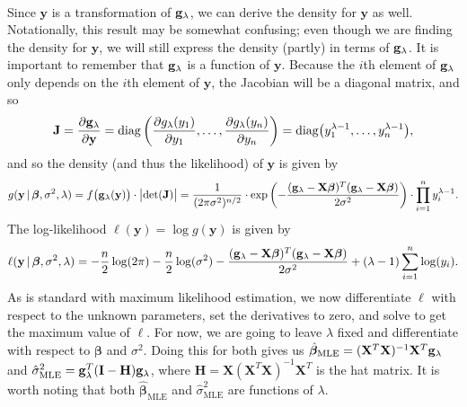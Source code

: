 \documentclass[10pt]{article}
\begin{document}
\begin{itemize}
\begin{align*}
    \end{align*}
    Since \(\mathbf{y}\) is a transformation of \(\mathbf{g}_{\lambda}\), we can derive the density for \(\mathbf{y}\) as well. Notationally, this result may be somewhat 
    confusing; even though we are finding the density for \(\mathbf{y}\), we will still express the density (partly) in terms of \(\mathbf{g}_{\lambda}\). It is important
    to remember that \(\mathbf{g}_{\lambda}\) is a function of \(\mathbf{y}\). Because the \(i\)th element of \(\mathbf{g}_{\lambda}\) only depends on the \(i\)th element of \(\mathbf{y}\), the Jacobian
    will be a diagonal matrix, and so 
    \begin{align*}
        \mathbf{J}
        = \frac{\partial \mathbf{g}_{\lambda}}{\partial \mathbf{y}}
        = \mathrm{diag} \left( \frac{\partial g_{\lambda}(y_1)}{\partial y_1}, \ldots, \frac{\partial g_{\lambda}(y_n)}{\partial y_n} \right)
        = \mathrm{diag} \big( y_1^{\lambda - 1}, \ldots, y_n^{\lambda - 1} \big), 
    \end{align*}
    and so the density (and thus the likelihood) of \(\mathbf{y}\) is given by 
    \begin{align*}
        g(\mathbf{y} \,|\, \bm{\beta}, \sigma^2, \lambda)
        = f \big( \mathbf{g}_{\lambda}(\mathbf{y}) \big) \cdot \big|\mathrm{det}(\mathbf{J})\big|
        = \frac{1}{(2\pi\sigma^2)^{n/2}} \cdot \mathrm{exp} \left( - \frac{(\mathbf{g}_{\lambda} - \mathbf{X}\bm{\beta})^T (\mathbf{g}_{\lambda} - \mathbf{X}\bm{\beta})}{2 \sigma^2} \right) \cdot \prod_{i=1}^n y_i^{\lambda - 1}.
    \end{align*}
    The log-likelihood \(\ell(\mathbf{y}) = \log g(\mathbf{y})\) is given by 
    \begin{align*}
        \ell(\mathbf{y} \,|\, \bm{\beta}, \sigma^2, \lambda) 
        = - \frac{n}{2} \log (2\pi) - \frac{n}{2} \log (\sigma^2) - \frac{(\mathbf{g}_{\lambda} - \mathbf{X}\bm{\beta})^T (\mathbf{g}_{\lambda} - \mathbf{X}\bm{\beta})}{2 \sigma^2} + (\lambda - 1) \sum_{i=1}^n \log (y_i).
    \end{align*}
    As is standard with maximum likelihood estimation, we now differentiate \(\ell\) with respect to the unknown parameters, set the derivatives to zero, and solve to get the maximum value of \(\ell\). 
    For now, we are going to leave \(\lambda\) fixed and differentiate with respect to \(\bm{\beta}\) and \(\sigma^2\). Doing this for both gives us 
    \(\hat{\bm{\beta}}_{\mathrm{MLE}} = (\mathbf{X}^T\mathbf{X})^{-1}\mathbf{X}^T\mathbf{g}_{\lambda}\) and \(\hat{\sigma}^2_{\mathrm{MLE}} = \mathbf{g}_{\lambda}^T (\mathbf{I} - \mathbf{H}) \mathbf{g}_{\lambda}\), where 
    \(\mathbf{H} = \mathbf{X}(\mathbf{X}^T\mathbf{X})^{-1}\mathbf{X}^T\) is the hat matrix. 
    It is worth noting that both \(\hat{\bm{\beta}}_{\mathrm{MLE}}\) and \(\hat{\sigma}^2_{\mathrm{MLE}}\) are functions of \(\lambda\). 

\end{itemize}
\end{document}
